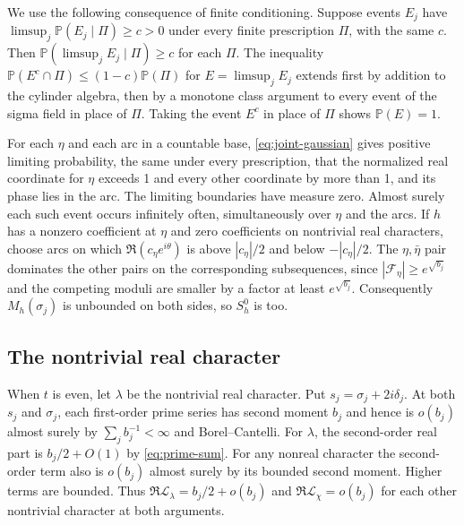 \documentclass[11pt,reqno]{amsart}
\newcommand{\PP}{\mathbb P}
\begin{document}
We use the following consequence of finite conditioning. Suppose events \(E_j\) have \(\limsup_j\PP(E_j\mid \Pi)\ge c>0\) under every finite prescription \(\Pi\), with the same \(c\). Then \(\PP(\limsup_j E_j\mid \Pi)\ge c\) for each \(\Pi\). The inequality \(\PP(E^c\cap \Pi)\le(1-c)\PP(\Pi)\) for \(E=\limsup_j E_j\) extends first by addition to the cylinder algebra, then by a monotone class argument to every event of the sigma field in place of \(\Pi\). Taking the event \(E^c\) in place of \(\Pi\) shows \(\PP(E)=1\).

For each \(\eta\) and each arc in a countable base, \eqref{eq:joint-gaussian} gives positive limiting probability, the same under every prescription, that the normalized real coordinate for \(\eta\) exceeds 1 and every other coordinate by more than 1, and its phase lies in the arc. The limiting boundaries have measure zero. Almost surely each such event occurs infinitely often, simultaneously over \(\eta\) and the arcs. If \(h\) has a nonzero coefficient at \(\eta\) and zero coefficients on nontrivial real characters, choose arcs on which \(\Re(c_\eta e^{i\theta})\) is above \(|c_\eta|/2\) and below \(-|c_\eta|/2\). The \(\eta,\bar\eta\) pair dominates the other pairs on the corresponding subsequences, since \(|\mathcal F_\eta|\ge e^{\sqrt{b_j}}\) and the competing moduli are smaller by a factor at least \(e^{\sqrt{b_j}}\). Consequently \(M_h(\sigma_j)\) is unbounded on both sides, so \(S_h^0\) is too.

\subsection*{The nontrivial real character}
When \(t\) is even, let \(\lambda\) be the nontrivial real character. Put \(s_j=\sigma_j+2i\delta_j\). At both \(s_j\) and \(\sigma_j\), each first-order prime series has second moment \(b_j\) and hence is \(o(b_j)\) almost surely by \(\sum_j b_j^{-1}<\infty\) and Borel--Cantelli. For \(\lambda\), the second-order real part is \(b_j/2+O(1)\) by \eqref{eq:prime-sum}. For any nonreal character the second-order term also is \(o(b_j)\) almost surely by its bounded second moment. Higher terms are bounded. Thus
\(\Re\mathcal L_\lambda=b_j/2+o(b_j)\) and \(\Re\mathcal L_\chi=o(b_j)\) for each other nontrivial character at both arguments.
\end{document}

